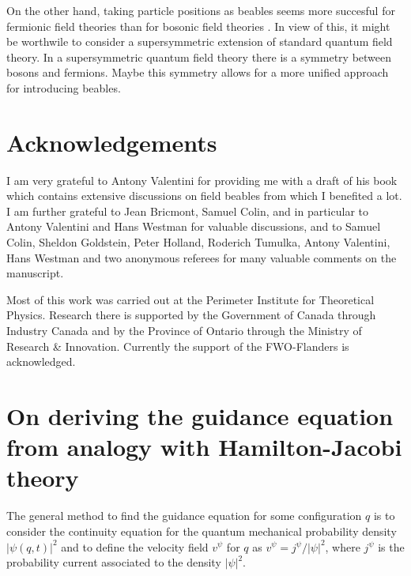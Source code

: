 \documentclass[12pt]{article}
\begin{document}
On the other hand, taking particle positions as beables seems more succesful for fermionic field theories than for bosonic field theories \cite{bell87b,durr02,durr031,durr032,tumulka03,durr04,colin031,colin032,colin033,colin07}. In view of this, it might be worthwile to consider a supersymmetric extension of standard quantum field theory. In a supersymmetric quantum field theory there is a symmetry between bosons and fermions. Maybe this symmetry allows for a more unified approach for introducing beables. 


\section{Acknowledgements}
I am very grateful to Antony Valentini for providing me with a draft of his book \cite{valentini09} which contains extensive discussions on field beables from which I benefited a lot. I am further grateful to Jean Bricmont, Samuel Colin, and in particular to Antony Valentini and Hans Westman for valuable discussions, and to Samuel Colin, Sheldon Goldstein, Peter Holland, Roderich Tumulka, Antony Valentini, Hans Westman and two anonymous referees for many valuable comments on the manuscript. 

Most of this work was carried out at the Perimeter Institute for Theoretical Physics. Research there is supported by the Government of Canada through Industry Canada and by the Province of Ontario through the Ministry of Research \& Innovation. Currently the support of the FWO-Flanders is acknowledged.








\appendix
\section{On deriving the guidance equation from analogy with Hamilton-Jacobi theory}\label{appendixa}
The general method to find the guidance equation for some configuration $q$ is to consider the continuity equation for the quantum mechanical probability density $|\psi(q,t)|^2$ and to define the velocity field $v^\psi$ for $q$ as $v^\psi=j^\psi/|\psi|^2$, where $j^\psi$ is the probability current associated to the density $|\psi|^2$.
\end{document}
